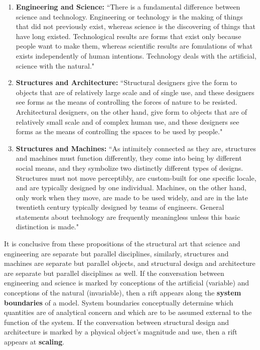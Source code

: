 \begin{enumerate}
  \item [] \textbf{Engineering and Science:} ``There is a fundamental difference between science and technology. Engineering or technology is the making of things that did not previously exist, whereas science is the discovering of things that have long existed. Technological results are forms that exist only because people want to make them, whereas scientific results are fomulations of what exists independently of human intentions. Technology deals with the artificial, science with the natural."\cite[p9]{TOWERANDBRIDGE}

  \item [] \textbf{Structures and Architecture:} ``Structural designers give the form to objects that are of relatively large scale and of single use, and these designers see forms as the means of controlling the forces of nature to be resisted. Architectural designers, on the other hand, give form to objects that are of relatively small scale and of complex human use, and these designers see forms as the means of controlling the spaces to be used by people." \cite[14]{TOWERANDBRIDGE}

  \item[] \textbf{Structures and Machines:} ``As intimitely connected as they are, structures and machines must function differently, they come into being by different social means, and they symbolize two distinctly different types of designs. Structures must not move perceptibly, are custom-built for one specific locale, and are typically designed by one individual. Machines, on the other hand, only work when they move, are made to be used widely, and are in the late twentieth century typically designed by teams of engineers. General statements about technology are frequently meaningless unless this basic distinction is made."\cite[p13]{TOWERANDBRIDGE}


\end{enumerate}

It is conclusive from these propositions of the structural art that science and engineering are separate but parallel disciplines, similarly, structures and machines are separate but parallel objects, and structural design and architecture are separate but parallel disciplines as well. If the conversation between engineering and science is marked by conceptions of the artificial (variable) and conceptions of the natural (invariable), then a rift appears along the \textbf{system boundaries} of a model. System boundaries conceptually determine which quantities are of analytical concern and which are to be assumed external to the function of the system. If the conversation between structural design and architecture is marked by a physical object's magnitude and use, then a rift appears at \textbf{scaling}.

